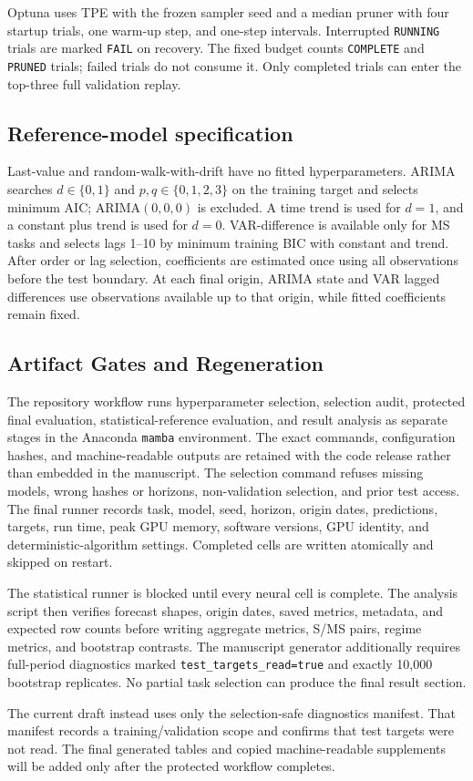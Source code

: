 Optuna uses TPE with the frozen sampler seed and a median pruner with four startup trials, one warm-up step, and one-step intervals.
Interrupted \texttt{RUNNING} trials are marked \texttt{FAIL} on recovery.
The fixed budget counts \texttt{COMPLETE} and \texttt{PRUNED} trials; failed trials do not consume it.
Only completed trials can enter the top-three full validation replay.

\subsection{Reference-model specification}

Last-value and random-walk-with-drift have no fitted hyperparameters.
ARIMA searches $d\in\{0,1\}$ and $p,q\in\{0,1,2,3\}$ on the training target and selects minimum AIC; ARIMA$(0,0,0)$ is excluded.
A time trend is used for $d=1$, and a constant plus trend is used for $d=0$.
VAR-difference is available only for MS tasks and selects lags 1--10 by minimum training BIC with constant and trend.
After order or lag selection, coefficients are estimated once using all observations before the test boundary.
At each final origin, ARIMA state and VAR lagged differences use observations available up to that origin, while fitted coefficients remain fixed.

\subsection{Artifact Gates and Regeneration}

The repository workflow runs hyperparameter selection, selection audit, protected final evaluation, statistical-reference evaluation, and result analysis as separate stages in the Anaconda \texttt{mamba} environment.
The exact commands, configuration hashes, and machine-readable outputs are retained with the code release rather than embedded in the manuscript.
The selection command refuses missing models, wrong hashes or horizons, non-validation selection, and prior test access.
The final runner records task, model, seed, horizon, origin dates, predictions, targets, run time, peak GPU memory, software versions, GPU identity, and deterministic-algorithm settings.
Completed cells are written atomically and skipped on restart.

The statistical runner is blocked until every neural cell is complete.
The analysis script then verifies forecast shapes, origin dates, saved metrics, metadata, and expected row counts before writing aggregate metrics, S/MS pairs, regime metrics, and bootstrap contrasts.
The manuscript generator additionally requires full-period diagnostics marked \texttt{test\_targets\_read=true} and exactly 10,000 bootstrap replicates.
No partial task selection can produce the final result section.

The current draft instead uses only the selection-safe diagnostics manifest.
That manifest records a training/validation scope and confirms that test targets were not read.
The final generated tables and copied machine-readable supplements will be added only after the protected workflow completes.
